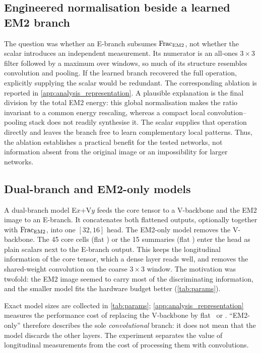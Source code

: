 \subsection{Engineered normalisation beside a learned EM2 branch}
\label{app:fraction_complementarity}
The question was whether an E-branch subsumes $\mathrm{Frac}_{\mathrm{EM2}}$, not whether the scalar introduces an independent measurement. Its numerator is an all-ones $3\times3$ filter followed by a maximum over windows, so much of its structure resembles convolution and pooling. If the learned branch recovered the full operation, explicitly supplying the scalar would be redundant. The corresponding ablation is reported in \cref{app:analysis_representation}. A plausible explanation is the final division by the total EM2 energy: this global normalisation makes the ratio invariant to a common energy rescaling, whereas a compact local convolution--pooling stack does not readily synthesise it. The scalar supplies that operation directly and leaves the branch free to learn complementary local patterns. Thus, the ablation establishes a practical benefit for the tested networks, not information absent from the original image or an impossibility for larger networks.

\subsection{Dual-branch and EM2-only models}
\label{app:em2only}
A dual-branch model E$x$+V$y$ feeds the core tensor to a V-backbone and the EM2 image to an E-branch. It concatenates both flattened outputs, optionally together with $\mathrm{Frac}_{\mathrm{EM2}}$, into one $[32,16]$ head. The EM2-only model removes the V-backbone. The 45 core cells (flat \CT) or the 15 summaries (flat \SUM) enter the head as plain scalars next to the E-branch output. This keeps the longitudinal information of the core tensor, which a dense layer reads well, and removes the shared-weight convolution on the coarse $3\times3$ window. The motivation was twofold: the EM2 image seemed to carry most of the discriminating information, and the smaller model fits the hardware budget better (\cref{tab:params}).

Exact model sizes are collected in \cref{tab:params}; \cref{app:analysis_representation} measures the performance cost of replacing the V-backbone by flat \CT\ or \SUM. ``EM2-only'' therefore describes the sole \emph{convolutional} branch: it does not mean that the model discards the other layers. The experiment separates the value of longitudinal measurements from the cost of processing them with convolutions.


